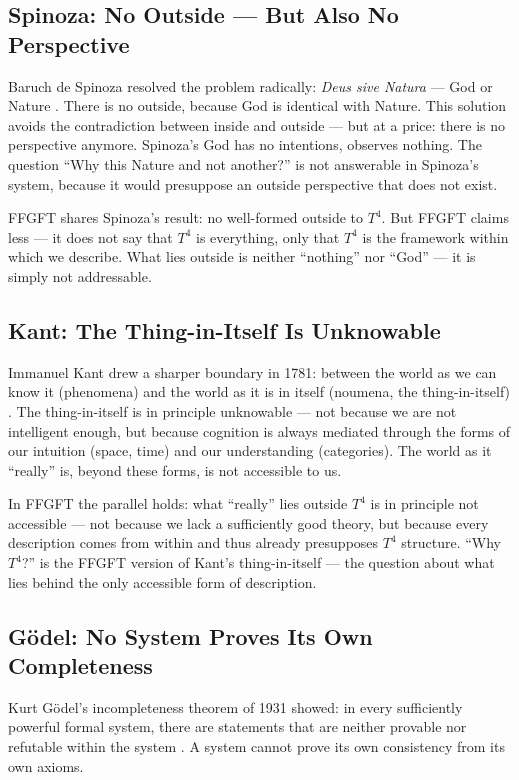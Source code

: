 \subsection{Spinoza: No Outside --- But Also No Perspective}

Baruch de Spinoza resolved the problem radically: \emph{Deus sive Natura} --- God or Nature \cite{Spinoza1677}. There is no outside, because God is identical with Nature. This solution avoids the contradiction between inside and outside --- but at a price: there is no perspective anymore. Spinoza's God has no intentions, observes nothing. The question ``Why this Nature and not another?'' is not answerable in Spinoza's system, because it would presuppose an outside perspective that does not exist.

FFGFT shares Spinoza's result: no well-formed outside to $T^4$. But FFGFT claims less --- it does not say that $T^4$ is everything, only that $T^4$ is the framework within which we describe. What lies outside is neither ``nothing'' nor ``God'' --- it is simply not addressable.

\subsection{Kant: The Thing-in-Itself Is Unknowable}

Immanuel Kant drew a sharper boundary in 1781: between the world as we can know it (phenomena) and the world as it is in itself (noumena, the thing-in-itself) \cite{Kant1781}. The thing-in-itself is in principle unknowable --- not because we are not intelligent enough, but because cognition is always mediated through the forms of our intuition (space, time) and our understanding (categories). The world as it ``really'' is, beyond these forms, is not accessible to us.

In FFGFT the parallel holds: what ``really'' lies outside $T^4$ is in principle not accessible --- not because we lack a sufficiently good theory, but because every description comes from within and thus already presupposes $T^4$ structure. ``Why $T^4$?'' is the FFGFT version of Kant's thing-in-itself --- the question about what lies behind the only accessible form of description.

\subsection{Gödel: No System Proves Its Own Completeness}

Kurt Gödel's incompleteness theorem of 1931 showed: in every sufficiently powerful formal system, there are statements that are neither provable nor refutable within the system \cite{Goedel1931}. A system cannot prove its own consistency from its own axioms.

